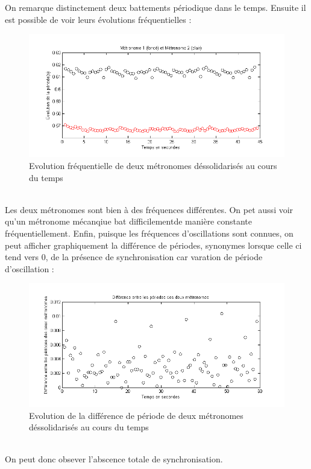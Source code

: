 \documentclass[a4paper,11pt]{report}
\begin{document}
On remarque distinctement deux battements périodique dans le temps. Ensuite il est possible de voir leurs évolutions fréquentielles :
\begin{figure}[h]
\centering
\includegraphics[width=1\textwidth]{Caracterisation_Frequence_200BPM}
\caption{Evolution fréquentielle de deux métronomes déssolidarisés au cours du temps}\label{CaractérisationF}
\end{figure}\\

Les deux métronomes sont bien à des fréquences différentes. On pet aussi voir qu'un métronome mécanqiue bat difficilementde manière constante fréquentiellement.
Enfin, puisque les fréquences d'oscillations sont connues, on peut afficher graphiquement la différence de périodes, synonymes lorsque celle ci tend vers 0, de la présence de synchronisation car varation de période d'oscillation :
\begin{figure}[h]
\centering
\includegraphics[width=1\textwidth]{Caracterisation_Periode_200BPM}
\caption{Evolution de la différence de période de deux métronomes déssolidarisés au cours du temps}\label{CaractérisationP}
\end{figure}\\
On peut donc obsever l'abscence totale de synchronisation.
\end{document}
